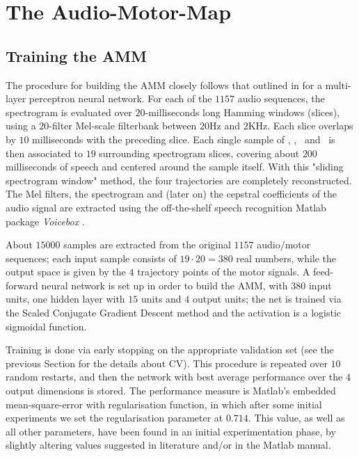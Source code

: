 \section{The Audio-Motor-Map}
\label{sec:rec}

\subsection{Training the AMM}
\label{subsec:amm_setup}

The procedure for building the AMM closely follows that outlined in
\cite{papcun,richmond,richmond2007} for a multi-layer perceptron neural network.
For each of the $1157$ audio sequences, the spectrogram is evaluated
over $20$-milliseconds long Hamming windows (slices), using a $20$-filter
Mel-scale filterbank between $20$Hz and $2$KHz. Each slice overlaps by $10$ milliseconds with
the preceding slice. Each single sample of \vlio, \alio, \vttu\ and \attu\ is
then associated to $19$ surrounding spectrogram slices, covering
about $200$ milliseconds of speech and centered around the sample itself. With this
"sliding spectrogram window" method, the four trajectories are completely reconstructed.
The Mel filters, the spectrogram and (later on) the cepstral coefficients of the audio
signal are extracted using the off-the-shelf speech recognition Matlab package
\emph{Voicebox} \cite{voicebox}.

About $15000$ samples are extracted from the original $1157$
audio/motor sequences; each input sample consists of $19\cdot 20 = 380$ real
numbers, while the output space is given by the $4$ trajectory points of
the motor signals. A feed-forward neural network is set up in order to
build the AMM, with $380$ input units, one hidden layer with $15$ units and
$4$ output units; the net is trained via the Scaled Conjugate Gradient
Descent method \cite{MOLLER93} and the activation is a logistic sigmoidal function.

Training is done via early stopping on the appropriate validation set (see the previous
Section for the details about CV). This procedure is repeated over $10$ random restarts, and then
the network with best average performance over the $4$ output dimensions is stored.
The performance measure is Matlab's embedded mean-square-error with regularisation
function, in which after some initial experiments we set the regularisation
parameter at $0.714$. This value, as well as all other parameters, have been found in
an initial experimentation phase, by slightly altering values suggested in literature
and/or in the Matlab manual.


